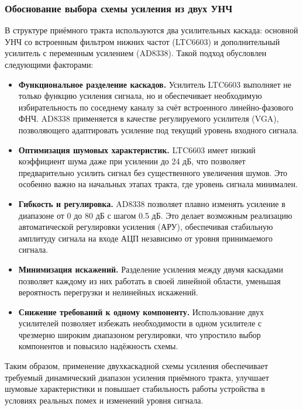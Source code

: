 \documentclass[a4paper,12pt]{article}
\begin{document}
\subsubsection{Обоснование выбора схемы усиления из двух УНЧ}

В структуре приёмного тракта используются два усилительных каскада: основной УНЧ со встроенным фильтром нижних частот (LTC6603) и дополнительный усилитель с переменным усилением (AD8338). Такой подход обусловлен следующими факторами:

\begin{itemize}
\item \textbf{Функциональное разделение каскадов.} Усилитель LTC6603 выполняет не только функцию усиления сигнала, но и обеспечивает необходимую избирательность по соседнему каналу за счёт встроенного линейно-фазового ФНЧ. AD8338 применяется в качестве регулируемого усилителя (VGA), позволяющего адаптировать усиление под текущий уровень входного сигнала.

\item \textbf{Оптимизация шумовых характеристик.} LTC6603 имеет низкий коэффициент шума даже при усилении до 24 дБ, что позволяет предварительно усилить сигнал без существенного увеличения шумов. Это особенно важно на начальных этапах тракта, где уровень сигнала минимален.

\item \textbf{Гибкость и регулировка.} AD8338 позволяет плавно изменять усиление в диапазоне от 0 до 80 дБ с шагом 0.5 дБ. Это делает возможным реализацию автоматической регулировки усиления (АРУ), обеспечивая стабильную амплитуду сигнала на входе АЦП независимо от уровня принимаемого сигнала.

\item \textbf{Минимизация искажений.} Разделение усиления между двумя каскадами позволяет каждому из них работать в своей линейной области, уменьшая вероятность перегрузки и нелинейных искажений.

\item \textbf{Снижение требований к одному компоненту.} Использование двух усилителей позволяет избежать необходимости в одном усилителе с чрезмерно широким диапазоном регулировки, что упростило выбор компонентов и повысило надёжность схемы.

\end{itemize}

Таким образом, применение двухкаскадной схемы усиления обеспечивает требуемый динамический диапазон усиления приёмного тракта, улучшает шумовые характеристики и повышает стабильность работы устройства в условиях реальных помех и изменений уровня сигнала.
\end{document}

